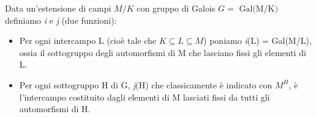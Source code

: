 \textsf{\small Data un'estensione di campi $M/K$ con gruppo di Galois $G = \text{ Gal(M/K)}$ definiamo \emph{i} e \emph{j} (due funzioni): } %

\begin{itemize}
	\item \textsf{\small Per ogni intercampo L (cioè tale che $K \subseteq L \subseteq M$) poniamo \emph{i}(L) = Gal(M/L), ossia il sottogruppo degli automorfismi di M che lasciano fissi gli elementi di L.}
	\item \textsf{\small Per ogni sottogruppo H di G, \emph{j}(H) che classicamente è indicato con $M^H$, è l'intercampo costituito dagli elementi di M lasciati fissi da tutti gli automorfismi di H.}
\end{itemize}

\textsf{\small } %

